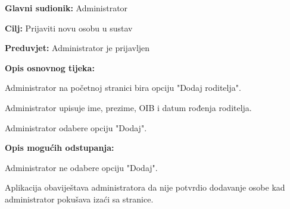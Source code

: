 					
					\noindent {}
					\begin{packed_item}
						
						\item \textbf{Glavni sudionik: }Administrator
						\item  \textbf{Cilj:} Prijaviti novu osobu u sustav
						\item  \textbf{Preduvjet:} Administrator je prijavljen
						\item  \textbf{Opis osnovnog tijeka:}
						
						\item[] \begin{packed_enum}
							
							\item Administrator na početnoj stranici bira opciju "Dodaj roditelja".
							\item Administrator upisuje ime, prezime, OIB i datum rođenja roditelja.
							\item Administrator odabere opciju "Dodaj".
						\end{packed_enum}
						
						\item  \textbf{Opis mogućih odstupanja:}
						
						\item[] \begin{packed_item}
							
							\item[3.a] Administrator ne odabere opciju "Dodaj".
							\item[] \begin{packed_enum}
								
								\item Aplikacija obaviještava administratora da nije potvrdio dodavanje osobe kad administrator pokušava izaći sa stranice.
							\end{packed_enum}
							
							
						\end{packed_item}
						
						
					\end{packed_item}
					
